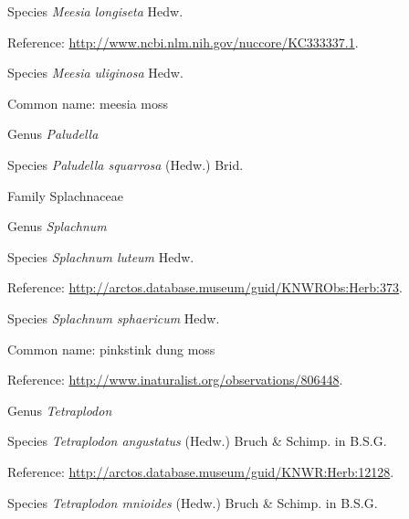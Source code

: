\documentclass[9pt, article]{memoir}
\begin{document}
\begin{multicols}{2}
\vspace{6pt}\noindent\hspace{36pt}Species \textit{Meesia longiseta} Hedw.


Reference: 
\url{http://www.ncbi.nlm.nih.gov/nuccore/KC333337.1}.

\vspace{6pt}\noindent\hspace{36pt}Species \textit{Meesia uliginosa} Hedw.


Common name: meesia moss

\vspace{6pt}\noindent\hspace{30pt}Genus \textit{Paludella}


\vspace{6pt}\noindent\hspace{36pt}Species \textit{Paludella squarrosa} (Hedw.) Brid.


\vspace{6pt}\noindent\hspace{24pt}Family Splachnaceae


\vspace{6pt}\noindent\hspace{30pt}Genus \textit{Splachnum}


\vspace{6pt}\noindent\hspace{36pt}Species \textit{Splachnum luteum} Hedw.


Reference: 
\url{http://arctos.database.museum/guid/KNWRObs:Herb:373}.

\vspace{6pt}\noindent\hspace{36pt}Species \textit{Splachnum sphaericum} Hedw.


Common name: pinkstink dung moss

Reference: 
\url{http://www.inaturalist.org/observations/806448}.

\vspace{6pt}\noindent\hspace{30pt}Genus \textit{Tetraplodon}


\vspace{6pt}\noindent\hspace{36pt}Species \textit{Tetraplodon angustatus} (Hedw.) Bruch \& Schimp. in B.S.G.


Reference: 
\url{http://arctos.database.museum/guid/KNWR:Herb:12128}.

\vspace{6pt}\noindent\hspace{36pt}Species \textit{Tetraplodon mnioides} (Hedw.) Bruch \& Schimp. in B.S.G.



\end{multicols}
\end{document}
